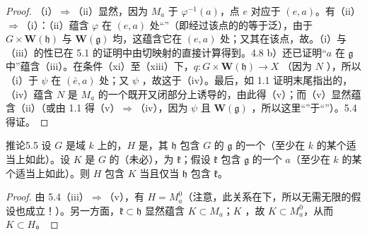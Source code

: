 \begin{proof}
（i）$\Rightarrow$（ii）显然，因为 $M_a$ 于 $\varphi^{-1}(a)$，点 $e$ 对应于 $(e,a)$。有（ii）$\Rightarrow$（i）：（ii）蕴含 $\varphi$ 在 $(e,a)$ 处“”（即经过该点的的等于泛），由于 $G\times\mathbf W(\mathfrak h)$ 与 $\mathbf W(\mathfrak g)$ 均，这蕴含它在 $(e,a)$ 处；又其在该点，故。（i）与（iii）的性已在 5.1 的证明中由切映射的直接计算得到。4.8 b）还已证明“$a$ 在 $\mathfrak g$ 中”蕴含（iii）。在条件（xi）至（xiii）下，$q:G\times\mathbf W(\mathfrak h)\to X$ （因为 $N$ ），所以（i）于 $\psi$ 在 $(\bar e,a)$ 处；又 $\psi$ ，故这于（iv）。最后，如 1.1 证明末尾指出的，（iv）蕴含 $N$ 是 $M_a$ 的一个既开又闭部分上诱导的，由此得（v）；而（v）显然蕴含（ii）（或由 1.1 得（v）$\Rightarrow$（iv），因为 $\psi$ 且 $\mathbf W(\mathfrak g)$ ，所以这里“”于“”）。5.4 得证。
\end{proof}
\begin{SGAresult}{推论}{5.5}
设 $G$ 是域 $k$ 上的，$H$ 是，其 $\mathfrak h$ 包含 $G$ 的 $\mathfrak g$ 的一个（至少在 $k$ 的某个适当上如此）。设 $K$ 是 $G$ 的（未必），为 $\mathfrak k$；假设 $\mathfrak k$ 包含 $\mathfrak g$ 的一个 $a$（至少在 $k$ 的某个适当上如此）。则 $H$ 包含 $K$ 当且仅当 $\mathfrak h$ 包含 $\mathfrak k$。
\end{SGAresult}
\begin{proof}
由 5.4（iii）$\Rightarrow$（v），有 $H=M_a^0$（注意，此关系在下，所以无需无限的假设也成立！）。另一方面，$\mathfrak k\subset\mathfrak h$ 显然蕴含 $K\subset M_a$；$K$ ，故 $K\subset M_a^0$，从而 $K\subset H$。
\end{proof}
